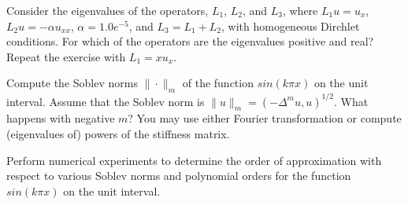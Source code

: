 \begin{exercise}
Consider the eigenvalues of the operators, 
$L_1$, $L_2$, and $L_3$, where
$L_1 u = u_x$, $L_2 u = -\alpha u_{xx}$, $\alpha=1.0e^{-5}$, 
and $L_3 = L_1 + L_2$, with homogeneous Dirchlet conditions. 
For which of the operators are the eigenvalues positive and
real? Repeat the exercise with $L_1 = x u_x$.   
\end{exercise}


\begin{exercise}
Compute the Soblev norms $\|\cdot\|_m$ of the function $sin(k \pi x)$ on 
the unit interval. Assume that the Soblev norm is $\|u\|_m = (-\Delta^m u, u)^{1/2}$.     
What happens with negative $m$? You may use either Fourier transformation or 
compute (eigenvalues of) powers of the stiffness matrix. 
\end{exercise}

\begin{exercise}
Perform numerical experiments to determine the order of approximation with respect 
to various Soblev norms and polynomial orders for the function  
$sin(k \pi x)$ on 
the unit interval.
\end{exercise}








